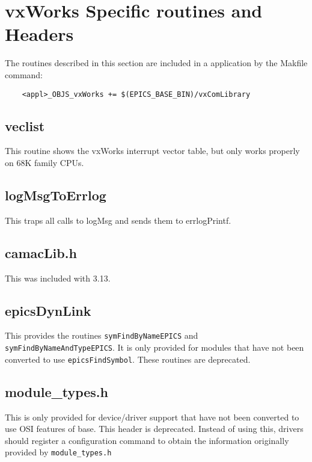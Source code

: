 \section{vxWorks Specific routines and Headers}

The routines described in this section are included in a application by the Makfile command:

\begin{verbatim}
    <appl>_OBJS_vxWorks += $(EPICS_BASE_BIN)/vxComLibrary
\end{verbatim}

\subsection{veclist}

This routine shows the vxWorks interrupt vector table, but only works properly on 68K family CPUs.

\subsection{logMsgToErrlog}

This traps all calls to logMsg and sends them to errlogPrintf.

\subsection{camacLib.h}

This was included with 3.13.

\subsection{epicsDynLink}

This provides the routines \verb|symFindByNameEPICS| and \verb|symFindByNameAndTypeEPICS|.
It is only provided for modules that have not been converted to use \verb|epicsFindSymbol|.
These routines are deprecated.

\subsection{module\_types.h}

This is only provided for device/driver support that have not been converted to use OSI features of base.
This header is deprecated.
Instead of using this, drivers should register a configuration command to obtain
the information originally provided by \verb|module_types.h|

